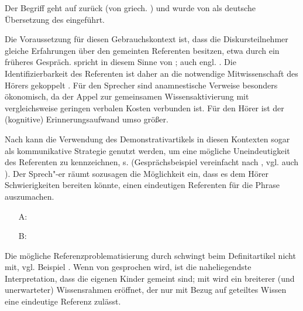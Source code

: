 \begin{exe}
	\ex \label{ex:anamn}   
\end{exe}

Der Begriff  geht auf \textcite{Buhler1934} zurück (von griech.  ) und wurde von \textcite{Himmelmann1997} als deutsche Übersetzung des  \parencite{Himmelmann1996,Diessel1999}  eingeführt.

Die Voraussetzung für diesen Gebrauchskontext ist, dass die Diskursteilnehmer gleiche Erfahrungen über den gemeinten Referenten besitzen, etwa durch ein früheres Gespräch. \textcite[44]{Bisle-Muller1991} spricht in diesem Sinne von ; auch engl.  \parencite[106]{Diessel1999}. Die Identifizierbarkeit des Referenten ist daher an die notwendige Mitwissenschaft des Hörers gekoppelt \parencite[72]{Szczepaniak2011a}. Für  den Sprecher sind anamnestische Verweise besonders ökonomisch, da der Appel zur gemeinsamen Wissensaktivierung mit vergleichsweise geringen verbalen Kosten verbunden ist. Für den Hörer ist der (kognitive) Erinnerungsaufwand umso größer.

Nach \textcite[79-80]{Bisle-Muller1991} kann die Verwendung des Demonstrativartikels in diesen Kontexten sogar als kommunikative Strategie genutzt werden, um eine mögliche Uneindeutigkeit des Referenten zu kennzeichnen, s.  (Gesprächsbeispiel vereinfacht nach \citealt[637]{Auer1984}, vgl. auch \citealt[58]{Himmelmann1997}). Der Sprech"-er räumt sozusagen die Möglichkeit ein, dass es dem Hörer Schwierigkeiten bereiten könnte, einen eindeutigen Referenten für die Phrase  auszumachen. 

\begin{exe}
	\ex \label{ex:auer} 
	\begin{itemize}
		\item[A:]  
		\item[B:]  
	\end{itemize}
\end{exe}

Die mögliche Referenzproblematisierung durch  schwingt beim Definitartikel nicht mit, vgl. Beispiel  \parencites()()[][80]{Bisle-Muller1991}[][70]{Himmelmann1997}. Wenn von  gesprochen wird, ist die naheliegendste Interpretation, dass die eigenen Kinder gemeint sind; mit  wird ein breiterer (und unerwarteter) Wissensrahmen eröffnet, der nur mit Bezug auf geteiltes Wissen eine eindeutige Referenz zulässt.    

